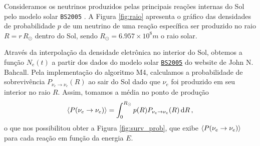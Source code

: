 \documentclass[12pt]{report}
\begin{document}
Consideramos os neutrinos produzidos pelas principais reações internas do Sol pelo modelo solar \texttt{BS2005} \cite{bahcall-model}. A Figura \ref{fig:raio} apresenta o gráfico das densidades de probabilidade $p$ de um neutrino de uma reação específica ser produzido no raio $R = r \, R_{\odot}$ dentro do Sol, sendo $R_\odot = 6.957 \times 10^8 \unit{m}$ o raio solar.

Através da interpolação da densidade eletrônica no interior do Sol, obtemos a função $N_e(t)$ a partir dos dados do modelo solar \href{http://www.sns.ias.edu/~jnb/SNdata/sndata.html#bs2005}{\texttt{BS2005}} \cite{bahcall} do website de John N. Bahcall. Pela implementação do algoritmo M4, calculamos a probabilidade de sobrevivência $P_{\nu_e \to \nu_e}(R)$ ao sair do Sol dado que $\nu_e$ foi produzido em seu interior no raio $R$. Assim, tomamos a média no ponto de produção
\begin{equation} \label{eq:media-raio}
\ev{P(\nu_e \to \nu_e)} = \int_0^{R_\odot} p(R) P_{\nu_e \to \nu_e}(R) \dd{R},
\end{equation}
o que nos possibilitou obter a Figura \ref{fig:surv_prob}, que exibe $\ev{P(\nu_e \to \nu_e)}$ para cada reação em função da energia $E$.
\end{document}
